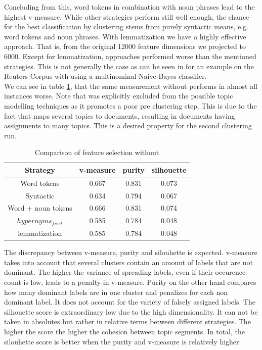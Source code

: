 Concluding from this, word tokens in combination with noun phrases lead to the highest v-measure. While other strategies perform still well enough, the chance for the best classification by clustering stems from purely syntactic means, e.g. word tokens and noun phrases. With \wordnet{} lemmatization we have a highly effective approach. That is, from the original 12000 feature dimensions we projected to 6000. Except for lemmatization, \wordnet{} approaches performed worse than the mentioned strategies. This is not generally the case as can be seen in \cite{TopicClassificationReuters2002} for an example on the Reuters Corpus with \wordnet{} using a multinominal Naive-Bayes classifier.\\
We can see in table \ref{comparison_single_without_lsa}, that the same measurement without \lsa{} performs in almost all instances worse. Note that \lda{} was explicitly excluded from the possible topic modelling techniques as it promotes a poor pre clustering step. This is due to the fact that \lda{} maps several topics to documents, resulting in documents having assignments to many topics. This is a desired property for the second clustering run.

  \begin{table}\label{comparison_single_without_lsa}
    \begin{tabular}{ c | c | c | c }
      Strategy    & v-measure & purity  & silhouette \\ \hline
      Word tokens & 0.667     & 0.831   & 0.073      \\
      Syntactic   & 0.634     & 0.794     & 0.067 \\
      Word + noun tokens & 0.666   & 0.831     & 0.074 \\
      \wordnet{} $hypernyms_{first}$ & 0.585   & 0.784     & 0.048 \\
      \wordnet{} lemmatization   & 0.585   & 0.784     & 0.048 \\
    \end{tabular}
    \caption{Comparison of feature selection without \lsa{}}
  \end{table}

The discrepancy between v-measure, purity and silouhette is expected. v-measure takes into account that several clusters contain an amount of labels that are not dominant. The higher the variance of spreading labels, even if their occurence count is low, leads to a penalty in v-measure. Purity on the other hand compares how many dominant labels are in one cluster and penalizes for each non dominant label. It does not account for the variety of falsely assigned labels. The silhouette score is extraordinary low due to the high dimensionality. It can not be taken in absolutes but rather in relative terms between different strategies. The higher the score the higher the cohesion between topic segments. In total, the silouhette score is better when the purity and v-measure is relatively higher.

